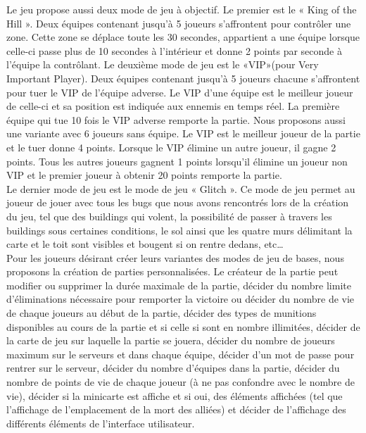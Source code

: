 \documentclass[12pt, titlepage]{article}
\begin{document}
\begin{spacing}{1.5}
Le jeu propose aussi deux mode de jeu à objectif. Le premier est le « King of the Hill ». Deux équipes contenant jusqu'à 5 joueurs s'affrontent pour contrôler une zone. Cette zone se déplace toute les 30 secondes, appartient a une équipe lorsque celle-ci passe plus de 10 secondes à l'intérieur et donne 2 points par seconde à l'équipe la contrôlant. Le deuxième mode de jeu est le «VIP»(pour Very Important Player). Deux équipes contenant jusqu'à 5 joueurs chacune s'affrontent pour tuer le VIP de l'équipe adverse. Le VIP d'une équipe est le meilleur joueur de celle-ci et sa position est indiquée aux ennemis en temps réel. La première équipe qui tue 10 fois le VIP adverse remporte la partie. Nous proposons aussi une variante avec 6 joueurs sans équipe. Le VIP est le meilleur joueur de la partie et le tuer donne 4 points. Lorsque le VIP élimine un autre joueur, il gagne 2 points. Tous les autres joueurs gagnent 1 points lorsqu'il élimine un joueur non VIP et le premier joueur à obtenir 20 points remporte la partie. \\

Le dernier mode de jeu est le mode de jeu « Glitch ». Ce mode de jeu permet au joueur de jouer avec tous les bugs que nous avons rencontrés lors de la création du jeu, tel que des buildings qui volent, la possibilité de passer à travers les buildings sous certaines conditions, le sol ainsi que les quatre murs délimitant la carte et le toit sont visibles et bougent si on rentre dedans, etc… \\

Pour les joueurs désirant créer leurs variantes des modes de jeu de bases, nous proposons la création de parties personnalisées. Le créateur de la partie peut modifier ou supprimer la durée maximale de la partie, décider du nombre limite d'éliminations nécessaire pour remporter la victoire ou décider du nombre de vie de chaque joueurs au début de la partie, décider des types de munitions disponibles au cours de la partie et si celle si sont en nombre illimitées, décider de la carte de jeu sur laquelle la partie se jouera, décider du nombre de joueurs maximum sur le serveurs et dans chaque équipe, décider d'un mot de passe pour rentrer sur le serveur, décider du nombre d'équipes dans la partie, décider du nombre de points de vie de chaque joueur (à ne pas confondre avec le nombre de vie), décider si la minicarte est affiche et si oui, des éléments affichées (tel que l'affichage de l'emplacement de la mort des alliées) et décider de l'affichage des différents éléments  de l'interface utilisateur. \\


\end{spacing}
\end{document}
